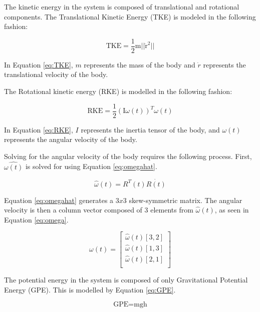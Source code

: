 The kinetic energy in the system is composed of translational and rotational components.
The Translational Kinetic Energy (TKE) is modeled in the following fashion:

\begin{equation}
\label{eq:TKE}
\text{TKE} = \frac{1}{2}{\text{m}}{\lvert \lvert {\dot{\text{r}}^2} \rvert \rvert}
\end{equation}

In Equation \ref{eq:TKE}, $m$ represents the mass of the body and $\dot{r}$ represents the translational velocity of the body.
\par
The Rotational kinetic energy (RKE) is modelled in the following fashion:

\begin{equation}
\label{eq:RKE}
\text{RKE} = \frac{1}{2}({\text{I}}{\omega(t)})^T\omega(t)
\end{equation}

In Equation \ref{eq:RKE}, $I$ represents the inertia tensor of the body, and $\omega(t)$ represents the angular velocity of the body.

Solving for the angular velocity of the body requires the following process. First, $\hat{\omega(t)}$ is solved for using Equation \ref{eq:omegahat}.

\begin{equation}
\label{eq:omegahat}
\hat{\omega}(t)=R^T(t)\dot{R(t)}
\end{equation}

Equation \ref{eq:omegahat} generates a $3x3$ skew-symmetric matrix. The angular velocity is then a column vector composed of 3 elements from $\hat{\omega}(t)$, as seen in Equation \ref{eq:omega}.

\begin{equation}
\label{eq:omega}
\omega(t)=\begin{bmatrix}
\hat{\omega}(t)[3,2] \\
\hat{\omega}(t)[1,3] \\
\hat{\omega}(t)[2,1]\\
\end{bmatrix}
\end{equation}

The potential energy in the system is composed of only Gravitational Potential Energy (GPE). This is modelled by Equation \ref{eq:GPE}.

\begin{equation}
\label{eq:GPE}
\text{GPE} = {\text{m}}{\text{g}}{\text{h}}
\end{equation}

